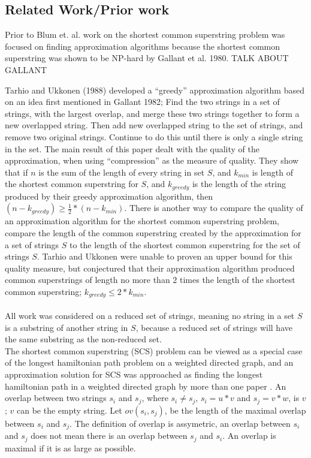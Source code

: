 \documentclass[letterpaper,11pt,titlepage]{article}
\begin{document}
\subsection{Related Work/Prior work}

Prior to Blum et. al. work on the shortest common superstring problem was focused on finding approximation algorithms because the shortest common superstring was shown to be NP-hard by Gallant et al. 1980.  
TALK ABOUT GALLANT

Tarhio and Ukkonen (1988) developed a ``greedy'' approximation algorithm based on an idea first mentioned in Gallant 1982; Find the two strings in a set of strings, with the largest overlap, and merge these two strings together to form a new overlapped string.  Then add new overlapped string to the set of strings, and remove two original strings.  Continue to do this until there is only a single string in the set.  The main result of this paper dealt with the quality of the approximation, when using ``compression'' as the measure of quality.  They show that if $n$ is the sum of the length of every string in set $S$, and $k_{min}$ is length of the shortest common superstring for $S$, and $k_{greedy}$ is the length of the string produced by their greedy approximation algorithm, then $(n - k_{greedy}) \geq \frac{1}{2}*(n - k_{min})$.  There is another way to compare the quality of an approximation algorithm for the shortest common superstring problem, compare the length of the common superstring created by the approximation for a set of strings $S$ to the length of the shortest common superstring for the set of strings $S$.  Tarhio and Ukkonen were unable to proven an upper bound for this quality measure, but conjectured that their approximation algorithm produced common superstrings  of length no more than $2$ times the length of the shortest common superstring; $k_{greedy} \leq 2*k_{min}$.  \\
\\
All work was considered on a reduced set of strings, meaning no string in a set $S$ is a substring of another string in $S$, because a reduced set of strings will have the same substring as the non-reduced set.\\
The shortest common superstring (SCS) problem can be viewed as a special case of the longest hamiltonian path problem on a weighted directed graph, and an approximation solution for SCS was approached as finding the longest hamiltonian path in a weighted directed graph by more than one paper \cite{tarhio1988greedy} \cite{turner1989approximation}.  An overlap between two strings $s_i$ and $s_j$, where $s_i \neq s_j$, $s_i = u*v$ and $s_j = v*w$, is $v$; $v$ can be the empty string.  Let $ov(s_i, s_j)$, be the length of the maximal overlap between $s_i$ and $s_j$.  The definition of overlap is assymetric, an overlap between $s_i$ and $s_j$ does not mean there is an overlap between $s_j$ and $s_i$.  An overlap is maximal if it is as large as possible.  \\ \\
\end{document}

